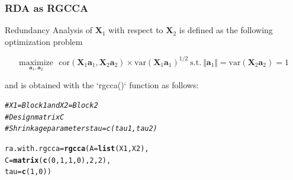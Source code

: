 \documentclass[10pt,xcolor=dvipsnames]{beamer}\usepackage[]{graphicx}\usepackage[]{color}
\makeatletter
\newcommand{\hlnum}[1]{\textcolor[rgb]{0.686,0.059,0.569}{#1}}%
\newcommand{\hlcom}[1]{\textcolor[rgb]{0.678,0.584,0.686}{\textit{#1}}}%
\newcommand{\hlstd}[1]{\textcolor[rgb]{0.345,0.345,0.345}{#1}}%
\newcommand{\hlkwb}[1]{\textcolor[rgb]{0.69,0.353,0.396}{#1}}%
\newcommand{\hlkwc}[1]{\textcolor[rgb]{0.333,0.667,0.333}{#1}}%
\newcommand{\hlkwd}[1]{\textcolor[rgb]{0.737,0.353,0.396}{\textbf{#1}}}%
\newenvironment{kframe}{%
 \def\at@end@of@kframe{}%
 \ifinner\ifhmode%
  \def\at@end@of@kframe{\end{minipage}}%
  \begin{minipage}{\columnwidth}%
 \fi\fi%
 \def\FrameCommand##1{\hskip\@totalleftmargin \hskip-\fboxsep
 \colorbox{shadecolor}{##1}\hskip-\fboxsep
     \hskip-\linewidth \hskip-\@totalleftmargin \hskip\columnwidth}%
 \MakeFramed {\advance\hsize-\width
   \@totalleftmargin\z@ \linewidth\hsize
   \@setminipage}}%
 {\par\unskip\endMakeFramed%
 \at@end@of@kframe}
\newenvironment{knitrout}{}{} %
\newcommand{\X}{\mathbf{X}}
\newcommand{\ma}[1]{\ensuremath{\mathbf{#1}}}
\makeatother
\begin{document}
\begin{frame}\frametitle{RDA as RGCCA}

Redundancy Analysis of $\X_1$ with respect to $\X_2$ is defined as the following optimization problem 

\begin{equation*}
\underset{\ma a_1, \ma a_2}{\text{maximize}} \text{
~~cor}\left(\X_1 \ma a_1, \X_2 \ma a_2 \right) \times \text{
var}\left(\X_1\ma a_1\right)^{1/2} \mathrm{~s.t.~} \Vert \ma a_1 \Vert = \text{var}(\X_2\ma a_2) = 1
\label{RA}
\end{equation*}

and is obtained with the `rgcca()` function as follows:

\begin{knitrout}\footnotesize
{}\color{fgcolor}\begin{kframe}
\begin{alltt}
\hlcom{# X1 = Block1 and X2 = Block2 }
\hlcom{# Design matrix C}
\hlcom{# Shrinkage parameters tau = c(tau1, tau2)}

\hlstd{ra.with.rgcca} \hlkwb{=} \hlkwd{rgcca}\hlstd{(}\hlkwc{A}\hlstd{=} \hlkwd{list}\hlstd{(X1, X2),}
                       \hlkwc{C} \hlstd{=} \hlkwd{matrix}\hlstd{(}\hlkwd{c}\hlstd{(}\hlnum{0}\hlstd{,} \hlnum{1}\hlstd{,} \hlnum{1}\hlstd{,} \hlnum{0}\hlstd{),} \hlnum{2}\hlstd{,} \hlnum{2}\hlstd{),}
                       \hlkwc{tau} \hlstd{=} \hlkwd{c}\hlstd{(}\hlnum{1}\hlstd{,} \hlnum{0}\hlstd{))}
\end{alltt}
\end{kframe}
\end{knitrout}
\end{frame}
\end{document}
